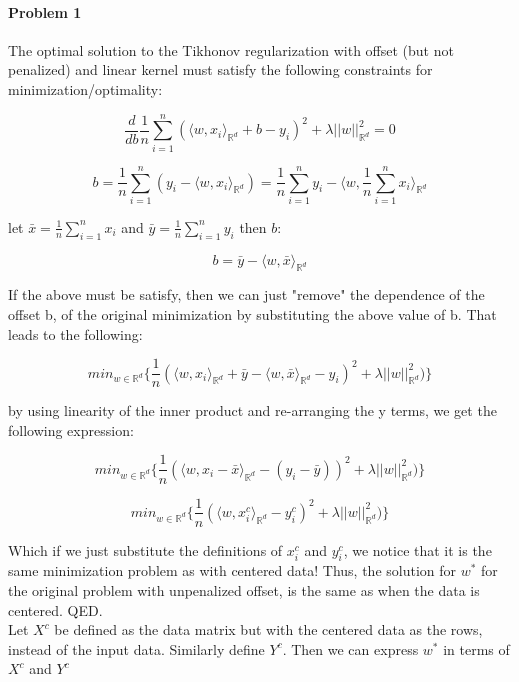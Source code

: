 \documentclass[12pt]{report}
\begin{document}
\maketitle

\paragraph{Problem 1}

The optimal solution to the Tikhonov regularization with offset (but not penalized) and linear kernel must satisfy the following constraints for minimization/optimality:

$$\frac{d}{db}\frac{1}{n}\sum_{i=1}^{n}(\langle w, x_i\rangle_{\mathbb{R}^d} +b - y_i)^2 + \lambda ||w||_{\mathbb{R}^d}^2 = 0$$

$$b= \frac{1}{n}\sum^{n}_{i=1} (y_i -\langle w, x_i\rangle_{\mathbb{R}^d}) = \frac{1}{n}\sum^{n}_{i=1} y_i -\langle w, \frac{1}{n}\sum^{n}_{i=1}x_i\rangle_{\mathbb{R}^d}$$

let $\bar{x} = \frac{1}{n}\sum^{n}_{i=1}x_i$ and $\bar{y} = \frac{1}{n}\sum^{n}_{i=1}y_i$ then $b$:

$$b= \bar{y} -\langle w, \bar{x} \rangle_{\mathbb{R}^d}$$

If the above must be satisfy, then we can just "remove" the dependence of the offset b, of the original minimization by substituting the above value of b. That leads to the following:

$$min_{w \in \mathbb{R}^d}\{ \frac{1}{n}( \langle w, x_i\rangle_{\mathbb{R}^d} +   \bar{y} -\langle w, \bar{x} \rangle_{\mathbb{R}^d} - y_i)^2 +  \lambda ||w||_{\mathbb{R}^d}^2)\}$$

by using linearity of the inner product and re-arranging the y terms, we get the following expression:

$$min_{w \in \mathbb{R}^d}\{ \frac{1}{n}( \langle w, x_i - \bar{x} \rangle_{\mathbb{R}^d} -   (y_i - \bar{y}))^2 +  \lambda ||w||_{\mathbb{R}^d}^2)\}$$

$$min_{w \in \mathbb{R}^d}\{ \frac{1}{n}( \langle w, x_i^c \rangle_{\mathbb{R}^d} -   y_i^c)^2 +  \lambda ||w||_{\mathbb{R}^d}^2)\}$$

Which if we just substitute the definitions of $x_i^c$ and $y_i^c$, we notice that it is the same minimization problem as with centered data! Thus, the solution for $w^*$ for the original problem with unpenalized offset, is the same as when the data is centered. QED. 
\\

Let $X^c$ be defined as the data matrix but with the centered data as the rows, instead of the input data. Similarly define $Y^c$. Then we can express $w^*$ in terms of $X^c$ and $Y^c$
\end{document}
